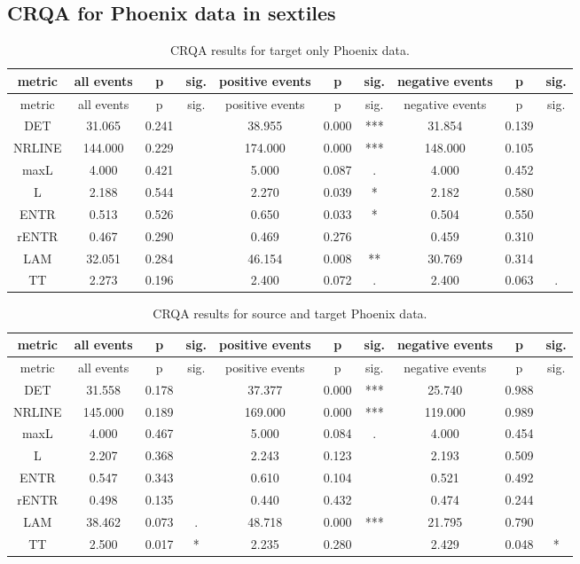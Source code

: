 \documentclass[english,man]{apa6}
\begin{document}
\begin{appendix}
\hypertarget{crqa-for-phoenix-data-in-sextiles}{%
\section{CRQA for Phoenix data in
sextiles}\label{crqa-for-phoenix-data-in-sextiles}}

\begin{longtable}[]{@{}cccccccccc@{}}
\caption{CRQA results for target only Phoenix data.}\tabularnewline
\toprule
metric & all events & p & sig. & positive events & p & sig. & negative
events & p & sig.\tabularnewline
\midrule
\endfirsthead
\toprule
metric & all events & p & sig. & positive events & p & sig. & negative
events & p & sig.\tabularnewline
\midrule
\endhead
DET & 31.065 & 0.241 & & 38.955 & 0.000 & *** & 31.854 & 0.139
&\tabularnewline
NRLINE & 144.000 & 0.229 & & 174.000 & 0.000 & *** & 148.000 & 0.105
&\tabularnewline
maxL & 4.000 & 0.421 & & 5.000 & 0.087 & . & 4.000 & 0.452
&\tabularnewline
L & 2.188 & 0.544 & & 2.270 & 0.039 & * & 2.182 & 0.580 &\tabularnewline
ENTR & 0.513 & 0.526 & & 0.650 & 0.033 & * & 0.504 & 0.550
&\tabularnewline
rENTR & 0.467 & 0.290 & & 0.469 & 0.276 & & 0.459 & 0.310
&\tabularnewline
LAM & 32.051 & 0.284 & & 46.154 & 0.008 & ** & 30.769 & 0.314
&\tabularnewline
TT & 2.273 & 0.196 & & 2.400 & 0.072 & . & 2.400 & 0.063 &
.\tabularnewline
\bottomrule
\end{longtable}

\begin{longtable}[]{@{}cccccccccc@{}}
\caption{CRQA results for source and target Phoenix
data.}\tabularnewline
\toprule
metric & all events & p & sig. & positive events & p & sig. & negative
events & p & sig.\tabularnewline
\midrule
\endfirsthead
\toprule
metric & all events & p & sig. & positive events & p & sig. & negative
events & p & sig.\tabularnewline
\midrule
\endhead
DET & 31.558 & 0.178 & & 37.377 & 0.000 & *** & 25.740 & 0.988
&\tabularnewline
NRLINE & 145.000 & 0.189 & & 169.000 & 0.000 & *** & 119.000 & 0.989
&\tabularnewline
maxL & 4.000 & 0.467 & & 5.000 & 0.084 & . & 4.000 & 0.454
&\tabularnewline
L & 2.207 & 0.368 & & 2.243 & 0.123 & & 2.193 & 0.509 &\tabularnewline
ENTR & 0.547 & 0.343 & & 0.610 & 0.104 & & 0.521 & 0.492
&\tabularnewline
rENTR & 0.498 & 0.135 & & 0.440 & 0.432 & & 0.474 & 0.244
&\tabularnewline
LAM & 38.462 & 0.073 & . & 48.718 & 0.000 & *** & 21.795 & 0.790
&\tabularnewline
TT & 2.500 & 0.017 & * & 2.235 & 0.280 & & 2.429 & 0.048 &
*\tabularnewline
\bottomrule
\end{longtable}


\end{appendix}
\end{document}
